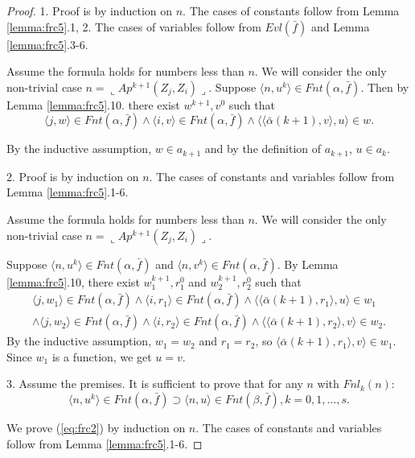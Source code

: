 \documentclass{asl}
\theoremstyle{definition}
\begin{document}
\begin{proof}
1. Proof is by induction on $n$. The cases of constants follow from Lemma \ref{lemma:frc5}.1, 2. The cases of variables follow from $Evl(\bar{f})$ and Lemma \ref{lemma:frc5}.3-6.

Assume the formula holds for numbers less than $n$. We will consider the only non-trivial case $n=\llcorner Ap^{k+1}(Z_j,Z_i)\lrcorner$. Suppose $\langle n,u^k\rangle\in Fnt(\alpha,\bar{f})$. Then by Lemma \ref{lemma:frc5}.10. there exist $w^{k+1}, v^0$ such that
\[\langle j,w\rangle\in Fnt(\alpha,\bar{f})
\wedge 
\langle i,v\rangle\in Fnt(\alpha,\bar{f})
\wedge
\langle\langle\bar{\alpha}(k+1),v\rangle,u\rangle\in w.\]

By the inductive assumption, $w\in a_{k+1}$ and by the definition of $a_{k+1}$, $u\in a_k$.

2. Proof is by induction on $n$. The cases of constants and variables follow from Lemma \ref{lemma:frc5}.1-6. 

Assume the formula holds for numbers less than $n$. We will consider the only non-trivial case $n=\llcorner Ap^{k+1}(Z_j,Z_i)\lrcorner$. 

\smallskip
Suppose $\langle n,u^k\rangle\in Fnt(\alpha,\bar{f})$ and $\langle n,v^k\rangle\in Fnt(\alpha,\bar{f})$. By Lemma \ref{lemma:frc5}.10, there exist $w_1^{k+1},r_1^0$ and $w_2^{k+1},r_2^0$ such that 
\begin{multline*}
\langle j,w_1\rangle\in Fnt(\alpha,\bar{f})\wedge\langle i,r_1\rangle\in Fnt(\alpha,\bar{f})\wedge\langle\langle \bar{\alpha}(k+1),r_1\rangle,u\rangle\in w_1
\\
\wedge
\langle j,w_2\rangle\in Fnt(\alpha,\bar{f})\wedge\langle i,r_2\rangle\in Fnt(\alpha,\bar{f})\wedge\langle\langle \bar{\alpha}(k+1),r_2\rangle,v\rangle\in w_2.
\end{multline*}
By the inductive assumption, $w_1=w_2$ and $r_1=r_2$, so $\langle \bar{\alpha}(k+1),r_1\rangle,v\rangle\in w_1$. Since $w_1$ is a function, we get $u=v$. 

3. Assume the premises. It is sufficient to prove that for any $n$ with $Fnl_k(n)$:
\begin{equation}
\langle n,u^k\rangle\in Fnt(\alpha,\bar{f})\supset\langle n,u\rangle\in  Fnt(\beta,\bar{f}), k=0,1,\ldots,s.
\label{eq:frc2}
\end{equation}

We prove (\ref{eq:frc2}) by induction on $n$. The cases of constants and variables follow from Lemma \ref{lemma:frc5}.1-6.  


\end{proof}
\end{document}
